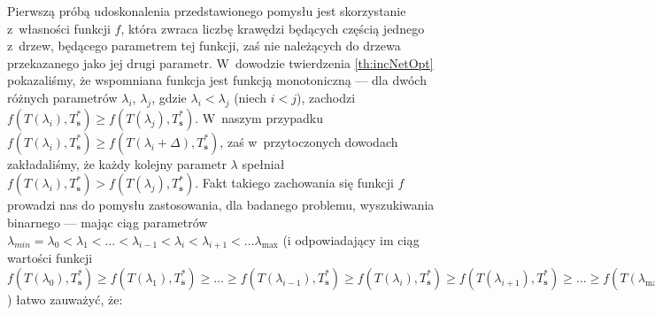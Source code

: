 Pierwszą próbą udoskonalenia przedstawionego pomysłu jest skorzystanie z~własności funkcji $f$, która zwraca liczbę krawędzi będących częścią jednego z~drzew, będącego parametrem tej funkcji, zaś nie należących do drzewa przekazanego jako jej drugi parametr.
W~dowodzie twierdzenia \ref{th:incNetOpt} pokazaliśmy, że wspomniana funkcja jest funkcją monotoniczną --- dla dwóch różnych parametrów $\lambda_{i}$, $\lambda_{j}$, gdzie $\lambda_{i} < \lambda_{j}$ (niech $i < j$), zachodzi $f \left( T \left( \lambda_{i} \right), T^{\ast}_{\textbf{s}} \right) \geqslant f \left( T \left( \lambda_{j} \right), T^{\ast}_{\textbf{s}} \right)$.
W~naszym przypadku $f \left( T \left( \lambda_{i} \right), T^{\ast}_{\textbf{s}} \right) \geqslant f \left( T \left( \lambda_{i} + \Delta \right), T^{\ast}_{\textbf{s}} \right)$, zaś w~przytoczonych dowodach zakładaliśmy, że każdy kolejny parametr $\lambda$ spełniał $f \left( T \left( \lambda_{i} \right), T^{\ast}_{\textbf{s}} \right) > f \left( T \left( \lambda_{j} \right), T^{\ast}_{\textbf{s}} \right)$.
Fakt takiego zachowania się funkcji $f$ prowadzi nas do pomysłu zastosowania, dla badanego problemu, wyszukiwania binarnego --- mając ciąg parametrów $\lambda_{min} = \lambda_{0} < \lambda_{1} < \dots < \lambda_{i-1} < \lambda_{i} < \lambda_{i+1} < \dots \lambda_{\text{max}}$ (i odpowiadający im ciąg wartości funkcji $f \left( T \left( \lambda_{0} \right), T^{\ast}_{\textbf{s}} \right) \geqslant f \left( T \left( \lambda_{1} \right), T^{\ast}_{\textbf{s}} \right) \geqslant \dots \geqslant f \left( T \left( \lambda_{i-1} \right), T^{\ast}_{\textbf{s}} \right) \geqslant f \left( T \left( \lambda_{i} \right), T^{\ast}_{\textbf{s}} \right) \geqslant f \left( T \left( \lambda_{i+1} \right), T^{\ast}_{\textbf{s}} \right) \geqslant \dots \geqslant f \left( T \left( \lambda_{\text{max}} \right), T^{\ast}_{\textbf{s}} \right)$) łatwo zauważyć, że:

